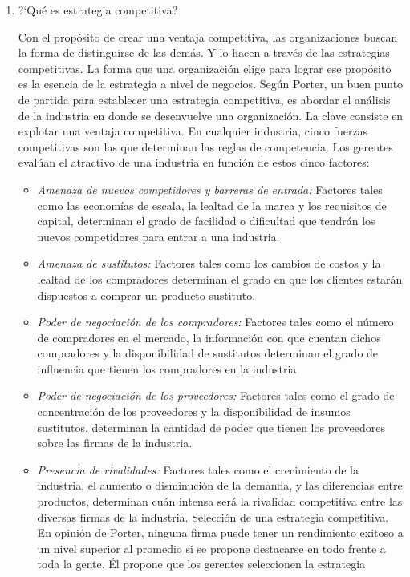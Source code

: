 \begin{enumerate}
	\item ?`Qu\'e es estrategia competitiva?

	Con el prop\'osito de crear una ventaja competitiva, las organizaciones buscan la forma de distinguirse de las dem\'as. Y lo hacen a
	trav\'es de las estrategias competitivas. La forma que una organizaci\'on elige para lograr ese prop\'osito es la esencia de la estrategia a
	nivel de negocios.
	Seg\'un Porter, un buen punto de partida para establecer una estrategia competitiva, es abordar el an\'alisis de la industria en donde se
	desenvuelve una organizaci\'on.
	La clave consiste en explotar una ventaja competitiva.
	En cualquier industria, cinco fuerzas competitivas son las que determinan las reglas de competencia.
	Los gerentes eval\'uan el atractivo de una industria en funci\'on de estos cinco factores:
	\begin{itemize}
		\item \emph{Amenaza de nuevos competidores y barreras de entrada:} Factores tales como las econom\'ias de escala, la lealtad de la marca y
			los requisitos de capital, determinan el grado de facilidad o dificultad que tendr\'an los nuevos competidores para entrar a una
			industria.
		\item \emph{Amenaza de sustitutos:} Factores tales como los cambios de costos y la lealtad de los compradores determinan el grado en que
			los clientes estar\'an dispuestos a comprar un producto sustituto.
		\item \emph{Poder de negociaci\'on de los compradores:} Factores tales como el n\'umero de compradores en el mercado, la informaci\'on con
			que cuentan dichos compradores y la disponibilidad de sustitutos determinan el grado de influencia que tienen los compradores
			en la industria
		\item \emph{Poder de negociaci\'on de los proveedores:} Factores tales como el grado de concentraci\'on de los proveedores y la disponibilidad
			de insumos sustitutos, determinan la cantidad de poder que tienen los proveedores sobre las firmas de la industria.
		\item \emph{Presencia de rivalidades:} Factores tales como el crecimiento de la industria, el aumento o disminuci\'on de la demanda, y las
			diferencias entre productos, determinan cu\'an intensa ser\'a la rivalidad competitiva entre las diversas firmas de la industria.
			Selecci\'on de una estrategia competitiva.         En opini\'on de Porter, ninguna firma puede tener un rendimiento exitoso a un nivel
			superior al promedio si se propone destacarse en todo frente a toda la gente. Él propone que los gerentes seleccionen la estrategia

\end{itemize}
\end{enumerate}
